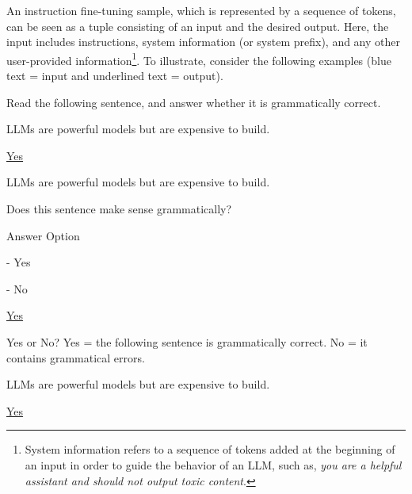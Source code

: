 An instruction fine-tuning sample, which is represented by a sequence of tokens, can be seen as a tuple consisting of an input and the desired output. Here, the input includes instructions, system information (or system prefix), and any other user-provided information\footnote{System information refers to a sequence of tokens added at the beginning of an input in order to guide the behavior of an LLM, such as, \textit{you are a helpful assistant and should not output toxic content}.}. To illustrate, consider the following examples (blue text = input and underlined text = output).

\vspace{0.5em}
\begin{tcolorbox}
\begin{center}
\parbox{0.9\textwidth}
{
{\color{blue} Read the following sentence, and answer whether it is grammatically correct.}

{\color{blue} LLMs are powerful models but are expensive to build.}

\vspace{0.3em}

\underline{Yes}
}
\end{center}
\end{tcolorbox}

\vspace{0.5em}
\begin{tcolorbox}
\begin{center}
\parbox{0.9\textwidth}
{
{\color{blue} LLMs are powerful models but are expensive to build.}

{\color{blue} Does this sentence make sense grammatically?}

{\color{blue} Answer Option}

{\color{blue} - Yes}

{\color{blue} - No}

\vspace{0.3em}

\underline{Yes}
}
\end{center}
\end{tcolorbox}

\vspace{0.5em}
\begin{tcolorbox}
\begin{center}
\parbox{0.9\textwidth}
{
{\color{blue} Yes or No? Yes = the following sentence is grammatically correct. No = it contains grammatical errors.}

{\color{blue} LLMs are powerful models but are expensive to build.}

\vspace{0.3em}

\underline{Yes}
}
\end{center}
\end{tcolorbox}
\vspace{0.5em}

